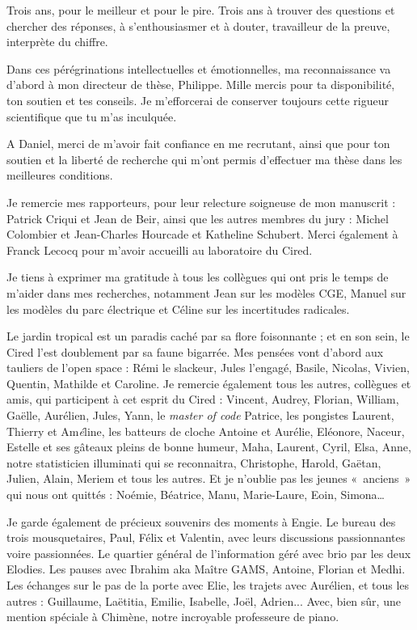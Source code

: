 
Trois ans, pour le meilleur et pour le pire. Trois ans à trouver des questions et chercher des réponses, à s’enthousiasmer et à douter, travailleur de la preuve, interprète du chiffre. 

Dans ces pérégrinations intellectuelles et émotionnelles, ma reconnaissance va d’abord à mon directeur de thèse, Philippe. Mille mercis pour ta disponibilité, ton soutien et tes conseils. Je m'efforcerai de conserver toujours cette rigueur scientifique que tu m'as inculquée. 

A Daniel, merci de m'avoir fait confiance en me recrutant, ainsi que pour ton soutien et la liberté de recherche qui m'ont permis d'effectuer ma thèse dans les meilleures conditions.

Je remercie mes rapporteurs, pour leur relecture soigneuse de mon manuscrit : Patrick Criqui et Jean de Beir, ainsi que les autres membres du jury : Michel Colombier et Jean-Charles Hourcade et Katheline Schubert. Merci également à Franck Lecocq pour m'avoir accueilli au laboratoire du Cired.

Je tiens à exprimer ma gratitude à tous les collègues qui ont pris le temps de m’aider dans mes recherches, notamment Jean sur les modèles CGE, Manuel sur les modèles du parc électrique et Céline sur les incertitudes radicales.

Le jardin tropical est un paradis caché par sa flore foisonnante ; et en son sein, le Cired l’est doublement par sa faune bigarrée. Mes pensées vont d’abord aux tauliers de l’open space : Rémi le slackeur, Jules l'engagé, Basile, Nicolas, Vivien, Quentin, Mathilde et Caroline. Je remercie également tous les autres, collègues et amis, qui participent à cet esprit du Cired : Vincent, Audrey, Florian, William, Gaëlle, Aurélien, Jules, Yann, le \textit{master of code} Patrice, les pongistes Laurent, Thierry et Am\textit{é}line, les batteurs de cloche Antoine et Aurélie, Eléonore, Naceur, Estelle et ses gâteaux pleins de bonne humeur, Maha, Laurent, Cyril, Elsa, Anne, notre statisticien illuminati qui se reconnaitra, Christophe, Harold, Gaëtan, Julien, Alain, Meriem et tous les autres. 
Et je n’oublie pas les jeunes «~anciens~» qui nous ont quittés : Noémie, Béatrice, Manu, Marie-Laure, Eoin, Simona…

Je garde également de précieux souvenirs des moments à Engie. Le bureau des trois mousquetaires, Paul, Félix et Valentin, avec leurs discussions passionnantes voire passionnées. Le quartier général de l'information géré avec brio par les deux Elodies. Les pauses avec Ibrahim aka Maître GAMS, Antoine, Florian et Medhi. Les échanges sur le pas de la porte avec Elie, les trajets avec Aurélien, et tous les autres : Guillaume, Laëtitia, Emilie, Isabelle, Joël, Adrien... Avec, bien sûr, une mention spéciale à Chimène, notre incroyable professeure de piano.


